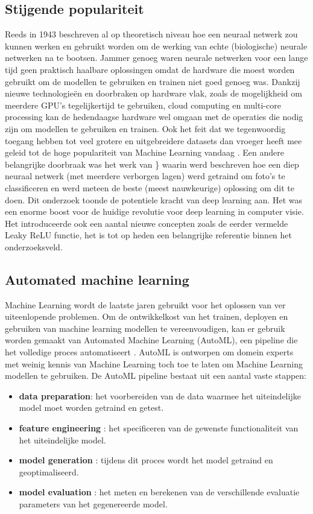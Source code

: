 {\subsection{Stijgende populariteit}
Reeds in 1943 beschreven \textcite{McCulloch1943} al op theoretisch niveau hoe een neuraal netwerk zou kunnen werken en gebruikt worden om de werking van echte (biologische) neurale netwerken na te bootsen. Jammer genoeg waren neurale netwerken voor een lange tijd geen praktisch haalbare oplossingen omdat  de hardware die moest worden gebruikt om de modellen te gebruiken en trainen niet goed genoeg was. Dankzij nieuwe technologieën en doorbraken op hardware vlak, zoals de mogelijkheid om meerdere GPU's tegelijkertijd te gebruiken, cloud computing en multi-core processing kan de hedendaagse hardware wel omgaan met de operaties die nodig zijn om modellen te gebruiken en trainen. Ook het feit dat we tegenwoordig toegang hebben tot veel grotere en uitgebreidere datasets dan vroeger heeft mee geleid tot de hoge populariteit van Machine Learning vandaag
\autocite{Ravi2017}. Een andere belangrijke doorbraak was het werk van \textcite{Krizhevsky2017}\} waarin werd beschreven hoe een diep neuraal netwerk (met meerdere verborgen lagen) werd getraind om foto's te classificeren  en werd meteen de beste (meest nauwkeurige) oplossing om dit te doen. Dit onderzoek toonde de potentiele kracht van deep learning aan. Het was een enorme boost voor de huidige revolutie voor deep learning in computer visie. Het introduceerde ook een aantal nieuwe concepten zoals de eerder vermelde Leaky ReLU functie, het is tot op heden een belangrijke referentie binnen het onderzoeksveld. 


\subsection{ Automated machine learning}
Machine Learning wordt de laatste jaren gebruikt voor het oplossen van ver uiteenlopende problemen. Om de ontwikkelkost van het trainen, deployen en gebruiken van machine learning modellen te vereenvoudigen, kan er gebruik worden gemaakt van Automated Machine Learning (AutoML), een pipeline die het volledige proces automatiseert \autocite{He2021}. AutoML is ontworpen om domein experts met weinig kennis van Machine Learning toch toe te laten om Machine Learning modellen te gebruiken. De AutoML pipeline bestaat uit een aantal vaste stappen: 
\begin{itemize}
\item \textbf{data preparation}: het voorbereiden van de data waarmee het uiteindelijke model moet worden getraind en getest.
\item\textbf{ feature engineering} : het specificeren van de gewenste functionaliteit van het uiteindelijke model. 
\item \textbf{model generation} :  tijdens dit proces wordt het model getraind en geoptimaliseerd. 
\item\textbf{ model evaluation} : het meten en berekenen van de verschillende evaluatie parameters van het gegenereerde model. 
\end{itemize}

}
